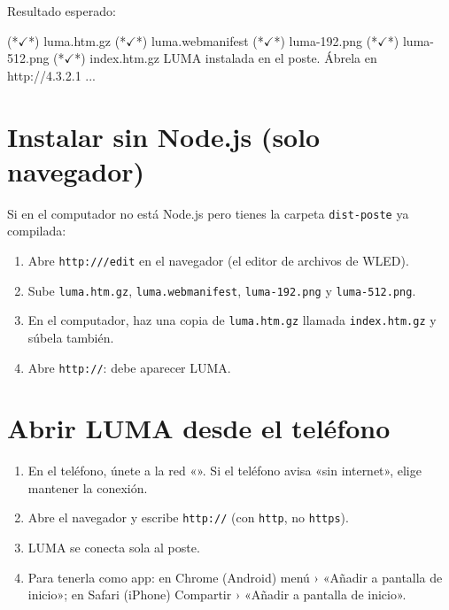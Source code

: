 Resultado esperado:
\begin{codigo}[escapeinside={(*}{*)}]
(*$\checkmark$*) luma.htm.gz
(*$\checkmark$*) luma.webmanifest
(*$\checkmark$*) luma-192.png
(*$\checkmark$*) luma-512.png
(*$\checkmark$*) index.htm.gz
LUMA instalada en el poste. Ábrela en http://4.3.2.1 ...
\end{codigo}


\section{Instalar sin Node.js (solo navegador)}

Si en el computador no está Node.js pero tienes la carpeta \texttt{dist-poste} ya compilada:
\begin{enumerate}
\item Abre \texttt{http:///edit} en el navegador (el editor de archivos de WLED).
\item Sube \texttt{luma.htm.gz}, \texttt{luma.webmanifest}, \texttt{luma-192.png} y \texttt{luma-512.png}.
\item En el computador, haz una copia de \texttt{luma.htm.gz} llamada \texttt{index.htm.gz} y súbela también.
\item Abre \texttt{http://}: debe aparecer LUMA.
\end{enumerate}


\section{Abrir LUMA desde el teléfono}

\begin{enumerate}
\item En el teléfono, únete a la red «». Si el teléfono avisa «sin internet», elige mantener la conexión.
\item Abre el navegador y escribe \texttt{http://} (con \texttt{http}, no \texttt{https}).
\item LUMA se conecta sola al poste.
\item Para tenerla como app: en Chrome (Android) menú › «Añadir a pantalla de inicio»; en Safari (iPhone) Compartir › «Añadir a pantalla de inicio».
\end{enumerate}

